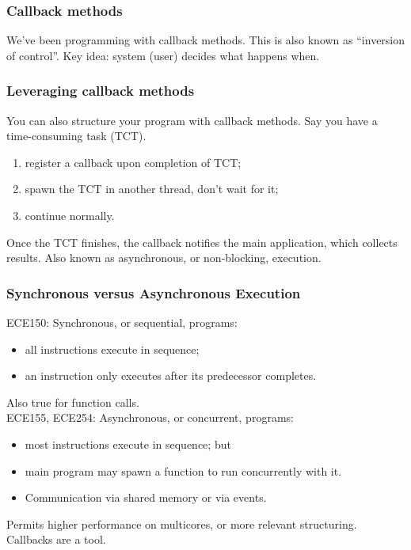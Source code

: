 \begin{frame}
\frametitle{Callback methods}

\begin{changemargin}{2.5cm}
We've been programming with \alert{callback methods}.\vfill
This is also known as ``inversion of control''.\vfill
Key idea: system (user) decides what happens when.
\end{changemargin}

\end{frame}

\begin{frame}
\frametitle{Leveraging callback methods}

\begin{changemargin}{1.5cm}
You can also structure your program with callback methods.
Say you have a time-consuming task (TCT).\vfill
\begin{enumerate}
\item register a callback upon completion of TCT;
\item spawn the TCT in another thread, don't wait for it;
\item continue normally.
\end{enumerate}\vfill
Once the TCT finishes, the callback notifies the main application,
which collects results.\vfill
Also known as asynchronous, or non-blocking, execution.
\end{changemargin}

\end{frame}

\begin{frame}
\frametitle{Synchronous versus Asynchronous Execution}

\begin{changemargin}{1cm}
ECE150: Synchronous, or sequential, programs:
\begin{itemize}
\item all instructions execute in sequence;
\item an instruction only executes after its predecessor completes.
\end{itemize}
Also true for function calls.\\[1em]

ECE155, ECE254: Asynchronous, or concurrent, programs:
\begin{itemize}
\item most instructions execute in sequence; but
\item main program may spawn a function to run concurrently with it.
\item Communication via shared memory or via events.
\end{itemize}
Permits higher performance on multicores, or more relevant structuring.
Callbacks are a tool.
\end{changemargin}

\end{frame}

